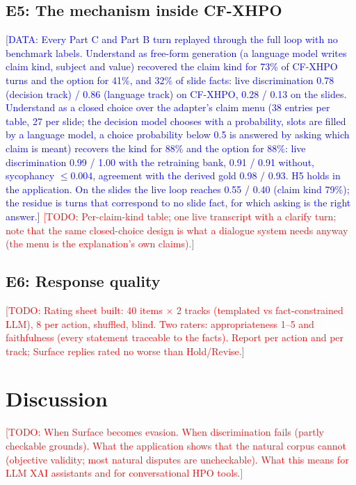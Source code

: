 \documentclass[preprint,12pt,3p,times]{elsarticle}
\newcommand{\todo}[1]{\textcolor{red}{[TODO: #1]}}
\newcommand{\done}[1]{\textcolor{blue}{[DATA: #1]}}   %
\begin{document}
\subsection{E5: The mechanism inside CF-XHPO}
\done{Every Part C and Part B turn replayed through the full loop with no benchmark labels. Understand as free-form generation (a language model writes claim kind, subject and value) recovered the claim kind for 73\% of CF-XHPO turns and the option for 41\%, and 32\% of slide facts: live discrimination 0.78 (decision track) / 0.86 (language track) on CF-XHPO, 0.28 / 0.13 on the slides. Understand as a closed choice over the adapter's claim menu (38 entries per table, 27 per slide; the decision model chooses with a probability, slots are filled by a language model, a choice probability below 0.5 is answered by asking which claim is meant) recovers the kind for 88\% and the option for 88\%: live discrimination 0.99 / 1.00 with the retraining bank, 0.91 / 0.91 without, sycophancy $\le 0.004$, agreement with the derived gold 0.98 / 0.93. H5 holds in the application. On the slides the live loop reaches 0.55 / 0.40 (claim kind 79\%); the residue is turns that correspond to no slide fact, for which asking is the right answer.} \todo{Per-claim-kind table; one live transcript with a clarify turn; note that the same closed-choice design is what a dialogue system needs anyway (the menu is the explanation's own claims).}
\subsection{E6: Response quality}
\todo{Rating sheet built: 40 items $\times$ 2 tracks (templated vs fact-constrained LLM), 8 per action, shuffled, blind. Two raters: appropriateness 1--5 and faithfulness (every statement traceable to the facts). Report per action and per track; Surface replies rated no worse than Hold/Revise.}

\section{Discussion}
\todo{When Surface becomes evasion. When discrimination fails (partly checkable grounds). What the application shows that the natural corpus cannot (objective validity; most natural disputes are uncheckable). What this means for LLM XAI assistants and for conversational HPO tools.}
\end{document}
